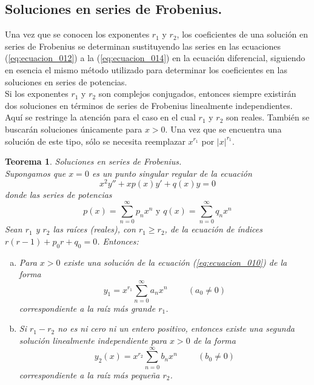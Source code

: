 \subsection{Soluciones en series de Frobenius.}
Una vez que se conocen los exponentes $r_{1}$ y $r_{2}$, los coeficientes de una solución en series de Frobenius se determinan sustituyendo las series en las ecuaciones (\ref{eq:ecuacion_012}) a la (\ref{eq:ecuacion_014}) en la ecuación diferencial, siguiendo en esencia el mismo método utilizado para determinar los coeficientes en las soluciones en series de potencias.
\\
Si los exponentes $r_{1}$ y $r_{2}$ son complejos conjugados, entonces siempre existirán dos soluciones en términos de series de Frobenius linealmente independientes. Aquí se restringe la atención para el caso en el cual $r_{1}$ y $r_{2}$ son reales. También se buscarán soluciones únicamente para $x>0$. Una vez que se encuentra una solución de este tipo, sólo se necesita reemplazar $x^{r_{1}}$ por $\vert x \vert^{r_{1}}$.
\newtheorem{teorema}{Teorema}
\begin{teorema}
\label{teo:Teorema_01}
Soluciones en series de Frobenius.
\\
Supongamos que $x=0$ es un punto singular regular de la ecuación
\begin{equation}
x^{2} y'' + xp(x) y' + q(x) y = 0
\end{equation}
donde las series de potencias
\[ p(x) = \sum_{n=0}^{\infty} p_{n} x^{n} \mbox{ y } q(x) = \sum_{n=0}^{\infty} q_{n} x^{n} \]
Sean $r_{1}$ y $r_{2}$ las raíces (reales), con $r_{1} \geq r_{2}$, de la ecuación de índices $r(r-1) + p_{0}r + q_{0} = 0$. Entonces:
\begin{enumerate}[(a)]
\item Para $x>0$ existe una solución de la ecuación (\ref{eq:ecuacion_010}) de la forma
\begin{equation}
y_{1} = x^{r_{1}} \sum_{n=0}^{\infty} a_{n} x^{n} \hspace{1cm} (a_{0} \neq 0)
\label{eq:ecuacion_018}
\end{equation}
correspondiente a la raíz más grande $r_{1}$.
\item Si $r_{1} - r_{2}$ no es ni cero ni un entero positivo, entonces existe una segunda solución linealmente independiente para $x > 0$ de la forma
\begin{equation}
y_{2}(x) = x^{r_{2}} \sum_{n=0}^{\infty} b_{n} x^{n} \hspace{1cm} (b_{0} \neq 0)
\label{eq:ecuacion_019}
\end{equation}
correspondiente a la raíz más pequeña $r_{2}$.
\end{enumerate}
\end{teorema}
